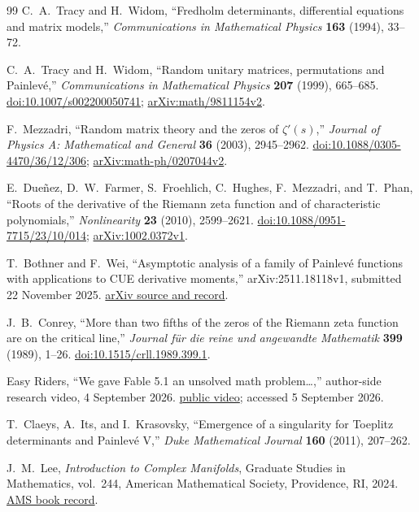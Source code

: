 \begin{thebibliography}{99}
C.~A.~Tracy and H.~Widom,
``Fredholm determinants, differential equations and matrix models,''
\emph{Communications in Mathematical Physics} \textbf{163} (1994), 33--72.

C.~A.~Tracy and H.~Widom,
``Random unitary matrices, permutations and Painlev\'e,''
\emph{Communications in Mathematical Physics} \textbf{207} (1999), 665--685.
\href{https://doi.org/10.1007/s002200050741}{doi:10.1007/s002200050741};
\href{https://arxiv.org/abs/math/9811154}{arXiv:math/9811154v2}.

F.~Mezzadri,
``Random matrix theory and the zeros of $\zeta'(s)$,''
\emph{Journal of Physics A: Mathematical and General} \textbf{36} (2003),
2945--2962.
\href{https://doi.org/10.1088/0305-4470/36/12/306}
{doi:10.1088/0305-4470/36/12/306};
\href{https://arxiv.org/abs/math-ph/0207044}{arXiv:math-ph/0207044v2}.

E.~Due\~nez, D.~W.~Farmer, S.~Froehlich, C.~Hughes, F.~Mezzadri, and T.~Phan,
``Roots of the derivative of the Riemann zeta function and of characteristic
polynomials,''
\emph{Nonlinearity} \textbf{23} (2010), 2599--2621.
\href{https://doi.org/10.1088/0951-7715/23/10/014}
{doi:10.1088/0951-7715/23/10/014};
\href{https://arxiv.org/abs/1002.0372}{arXiv:1002.0372v1}.

T.~Bothner and F.~Wei,
``Asymptotic analysis of a family of Painlev\'e functions with applications to
CUE derivative moments,''
arXiv:2511.18118v1, submitted 22 November 2025.
\href{https://arxiv.org/abs/2511.18118}{arXiv source and record}.

J.~B.~Conrey,
``More than two fifths of the zeros of the Riemann zeta function are on the
critical line,''
\emph{Journal f\"ur die reine und angewandte Mathematik} \textbf{399} (1989),
1--26.
\href{https://doi.org/10.1515/crll.1989.399.1}
{doi:10.1515/crll.1989.399.1}.

Easy Riders,
``We gave Fable 5.1 an unsolved math problem\ldots,''
author-side research video, 4 September 2026.
\href{https://www.youtube.com/watch?v=LHXfb0LYsX8}{public video};
accessed 5 September 2026.

T.~Claeys, A.~Its, and I.~Krasovsky,
``Emergence of a singularity for Toeplitz determinants and Painlev\'e V,''
\emph{Duke Mathematical Journal} \textbf{160} (2011), 207--262.

J.~M.~Lee,
\emph{Introduction to Complex Manifolds},
Graduate Studies in Mathematics, vol.~244,
American Mathematical Society, Providence, RI, 2024.
\href{https://bookstore.ams.org/GSM/244}{AMS book record}.


\end{thebibliography}
